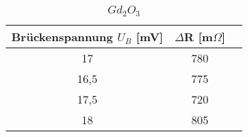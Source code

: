 \begin{table}[h]
	\begin{center}
		\begin{tabular}{ccc}
			Brückenspannung $U_B$ [mV] & $\Delta$R [m$\Omega$]\\ \hline
			17	&780\\
			16,5&775\\
			17,5&720\\
			18	&805\\
		\end{tabular}
		\caption{$Gd_2O_3$}
		\label{tab3}
	\end{center}
\end{table}